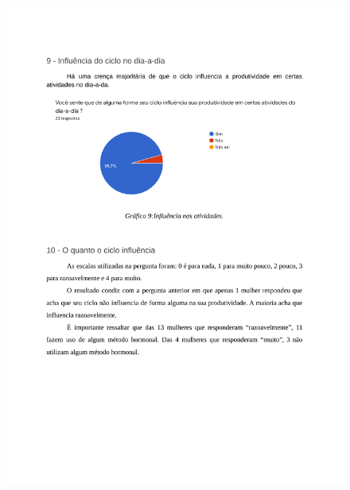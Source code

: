 \begin{apendicesenv}
        \begin{figure}[ht]
            \centering
            \includegraphics[keepaspectratio=true,scale=0.7]{figuras/Tab7.pdf}
        \end{figure}
        

\end{apendicesenv}
